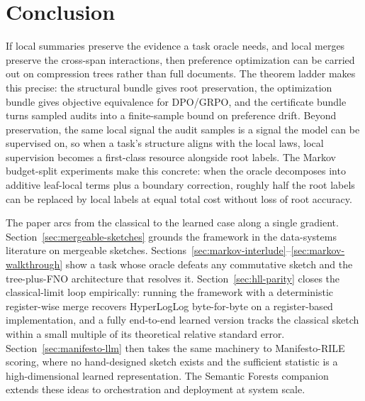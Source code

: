 \section{Conclusion}\label{sec:conclusion}

If local summaries preserve the evidence a task oracle needs, and local merges preserve the cross-span interactions, then preference optimization can be carried out on compression trees rather than full documents. The theorem ladder makes this precise: the structural bundle gives root preservation, the optimization bundle gives objective equivalence for DPO/GRPO, and the certificate bundle turns sampled audits into a finite-sample bound on preference drift. Beyond preservation, the same local signal the audit samples is a signal the model can be supervised on, so when a task's structure aligns with the local laws, local supervision becomes a first-class resource alongside root labels. The Markov budget-split experiments make this concrete: when the oracle decomposes into additive leaf-local terms plus a boundary correction, roughly half the root labels can be replaced by local labels at equal total cost without loss of root accuracy.

The paper arcs from the classical to the learned case along a single gradient. Section~\ref{sec:mergeable-sketches} grounds the framework in the data-systems literature on mergeable sketches. Sections~\ref{sec:markov-interlude}--\ref{sec:markov-walkthrough} show a task whose oracle defeats any commutative sketch and the tree-plus-FNO architecture that resolves it. Section~\ref{sec:hll-parity} closes the classical-limit loop empirically: running the framework with a deterministic register-wise merge recovers HyperLogLog byte-for-byte on a register-based implementation, and a fully end-to-end learned version tracks the classical sketch within a small multiple of its theoretical relative standard error. Section~\ref{sec:manifesto-llm} then takes the same machinery to Manifesto-RILE scoring, where no hand-designed sketch exists and the sufficient statistic is a high-dimensional learned representation. The Semantic Forests companion extends these ideas to orchestration and deployment at system scale.
